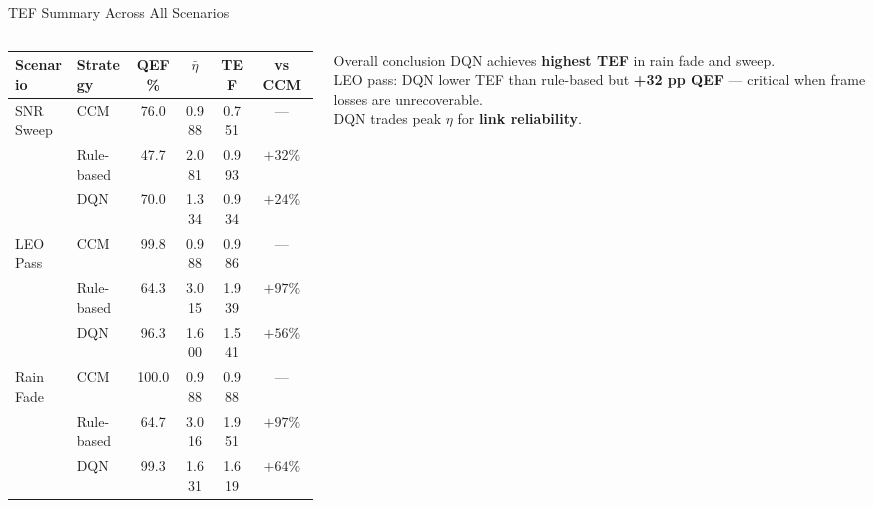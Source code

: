 \documentclass[aspectratio=169,10pt]{beamer}
\begin{document}
\begin{frame}{TEF Summary Across All Scenarios}
  \begin{columns}[T]
    \begin{column}{0.62\textwidth}
      {\scriptsize
      \begin{tabular}{lp{1.6cm}cccc}
        \toprule
        \textbf{Scenario} & \textbf{Strategy} & \textbf{QEF\%} & \textbf{$\bar{\eta}$} & \textbf{TEF} & \textbf{vs CCM}\\
        \midrule
        \multirow{3}{*}{SNR Sweep}
          & CCM        & 76.0 & 0.988 & 0.751 & ---\\
          & Rule-based & 47.7 & 2.081 & 0.993 & $+32\%$\\
          & \alert{DQN}& \alert{70.0}& 1.334 & \alert{0.934} & $+24\%$\\
        \midrule
        \multirow{3}{*}{LEO Pass}
          & CCM        & 99.8 & 0.988 & 0.986 & ---\\
          & Rule-based & 64.3 & 3.015 & 1.939 & $+97\%$\\
          & \alert{DQN}& \alert{96.3}& 1.600 & \alert{1.541} & $+56\%$\\
        \midrule
        \multirow{3}{*}{Rain Fade}
          & CCM        & 100.0& 0.988 & 0.988 & ---\\
          & Rule-based &  64.7& 3.016 & 1.951 & $+97\%$\\
          & \alert{DQN}& \alert{99.3}& 1.631 & \alert{1.619} & $+64\%$\\
        \bottomrule
      \end{tabular}}
    \end{column}
    \begin{column}{0.35\textwidth}
      \begin{keybox}{Overall conclusion}
        \scriptsize DQN achieves \textbf{highest TEF} in rain fade and sweep.\\[3pt]
        LEO pass: DQN lower TEF than rule-based but \textbf{+32 pp QEF} — critical when frame losses are unrecoverable.\\[3pt]
        DQN trades peak $\eta$ for \textbf{link reliability}.
      \end{keybox}
    \end{column}
  \end{columns}
\end{frame}
\end{document}
